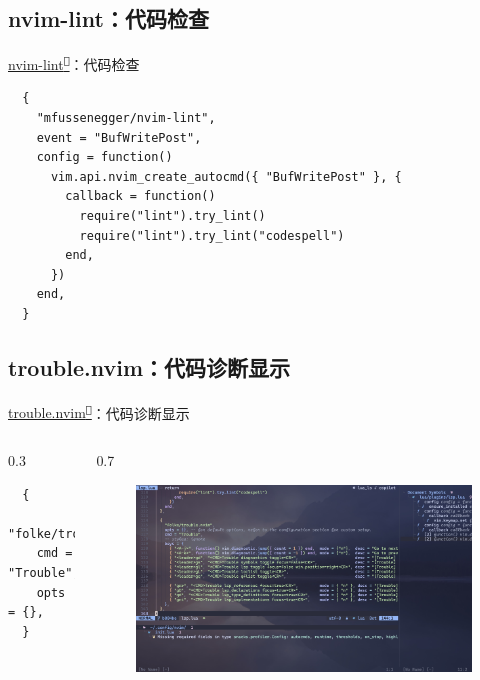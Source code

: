 \documentclass[aspectratio=169]{ctexbeamer}
\newcommand{\nerd}[1]{\texttt{#1}}
\newcommand{\link}[3][]{\href{#3}{#2\textsuperscript{\nerd{}}}}
\begin{document}
  \subsection{nvim-lint：代码检查}
    \begin{frame}[fragile]{\link{nvim-lint}{https://github.com/mfussenegger/nvim-lint}：代码检查}
      \begin{lstlisting}
  {
    "mfussenegger/nvim-lint",
    event = "BufWritePost",
    config = function()
      vim.api.nvim_create_autocmd({ "BufWritePost" }, {
        callback = function()
          require("lint").try_lint()
          require("lint").try_lint("codespell")
        end,
      })
    end,
  }
      \end{lstlisting}
    \end{frame}

  \subsection{trouble.nvim：代码诊断显示}
    \begin{frame}[fragile]{\link{trouble.nvim}{https://github.com/folke/trouble.nvim}：代码诊断显示}
      \begin{columns}
        \begin{column}{0.3\linewidth}
          \begin{lstlisting}
  {
    "folke/trouble.nvim",
    cmd = "Trouble",
    opts = {},
  }
    \end{lstlisting}
        \end{column}
        \begin{column}{0.7\linewidth}
          \begin{figure}[H]
            \centering
            \includegraphics[width=0.9\linewidth]{./Figures/Trouble_UI.jpg}
          \end{figure}
        \end{column}
      \end{columns}
    \end{frame}
\end{document}
